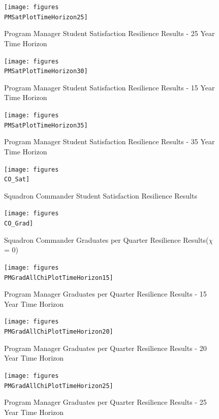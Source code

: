 \begin{figure}[h]
  \centering\texttt{[image: figures\\PMSatPlotTimeHorizon25]}
  \caption{Program Manager Student Satisfaction Resilience Results - 25 Year Time Horizon}
  \label{f:PMresultsSat25}
\end{figure}

\begin{figure}[h]
  \centering\texttt{[image: figures\\PMSatPlotTimeHorizon30]}
  \caption{Program Manager Student Satisfaction Resilience Results - 15 Year Time Horizon}
  \label{f:PMresultsSat30}
\end{figure}

\begin{figure}[h]
  \centering\texttt{[image: figures\\PMSatPlotTimeHorizon35]}
  \caption{Program Manager Student Satisfaction Resilience Results - 35 Year Time Horizon}
  \label{f:PMresultsSat35}
\end{figure}

\begin{figure}[h]
  \centering\texttt{[image: figures\\CO\_Sat]}
  \caption{Squadron Commander Student Satisfaction Resilience Results}
  \label{f:CO_Sat}
\end{figure}

\begin{figure}[h]
  \centering\texttt{[image: figures\\CO\_Grad]}
  \caption{Squadron Commander Graduates per Quarter Resilience
    Results($\chi$ = 0)}
  \label{f:CO_Grad}
\end{figure}
\begin{figure}[h]
  \centering\texttt{[image: figures\\PMGradAllChiPlotTimeHorizon15]}
  \caption{Program Manager Graduates per Quarter Resilience Results  - 15 Year Time Horizon}
  \label{f:PMresultsGradAllChi15}
\end{figure}


\begin{figure}[h]
  \centering\texttt{[image: figures\\PMGradAllChiPlotTimeHorizon20]}
  \caption{Program Manager Graduates per Quarter Resilience Results  - 20 Year Time Horizon}
  \label{f:PMresultsGradAllChi20}
\end{figure}

\begin{figure}[h]
  \centering\texttt{[image: figures\\PMGradAllChiPlotTimeHorizon25]}
  \caption{Program Manager Graduates per Quarter Resilience Results - 25 Year Time Horizon}
  \label{f:PMresultsGradAllChi25}
\end{figure}

